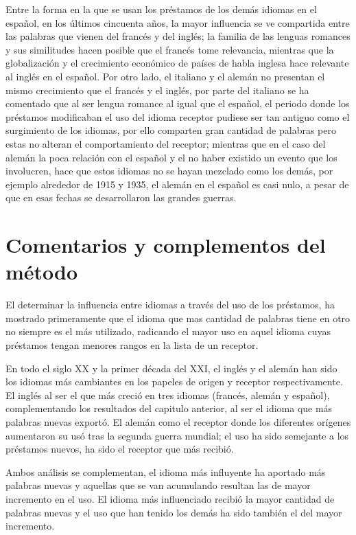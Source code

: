 Entre la forma en la que se usan los préstamos de los demás idiomas en el español,  en los últimos cincuenta años, la mayor influencia se ve compartida entre las palabras que vienen del francés y  del inglés;  la familia de las lenguas romances y sus similitudes hacen posible que el francés tome relevancia, mientras que la globalización y el crecimiento económico de países de habla inglesa hace relevante al inglés en el español.   Por otro lado,  el italiano y el alemán  no presentan el mismo crecimiento que el francés y el inglés,  por parte del italiano se ha comentado que al ser lengua romance al igual que el español,  el periodo donde los préstamos modificaban el uso del idioma receptor pudiese ser tan antiguo como el surgimiento de los idiomas,  por ello comparten gran cantidad de palabras pero estas no alteran el comportamiento del receptor; mientras que en el caso del alemán la poca relación con el español y el no haber existido un evento que los involucren,  hace que estos idiomas no se hayan mezclado como los demás,  por ejemplo alrededor de 1915 y 1935,  el alemán en el español es casi nulo, a pesar de que en esas fechas se desarrollaron las grandes guerras.

\section{Comentarios y complementos del método} %


El determinar la influencia entre idiomas a través del uso de los préstamos, ha mostrado primeramente que el idioma que mas cantidad de palabras tiene en otro no siempre es el más utilizado,  radicando el mayor uso en aquel idioma cuyas préstamos tengan menores rangos en la lista de un receptor. 

En todo el siglo XX y la primer década del XXI, el inglés y el alemán han sido los idiomas más cambiantes en los papeles de origen y receptor respectivamente.
El inglés al ser el que más creció en tres idiomas (francés, alemán y español), complementando los resultados del capitulo anterior, al ser el idioma que más palabras nuevas exportó.  El alemán como el receptor donde los diferentes orígenes aumentaron su usó tras la segunda guerra mundial; el uso ha sido semejante a los préstamos nuevos, ha sido el receptor que más recibió. 

Ambos análisis se complementan,  el idioma más influyente ha aportado más palabras nuevas y aquellas que se van acumulando resultan las de mayor incremento en el uso. El idioma más influenciado recibió la mayor cantidad de palabras nuevas y el uso que han tenido los demás ha sido también el del mayor incremento. 

